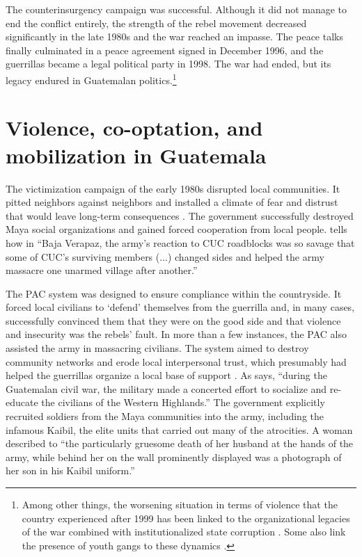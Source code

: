 \documentclass[12pt, notitlepage]{article}
\begin{document}
The counterinsurgency campaign was successful.
Although it did not manage to end the conflict entirely, the strength of the rebel movement decreased significantly in the late 1980s and the war reached an impasse.
The peace talks finally culminated in a peace agreement signed in December 1996, and the guerrillas became a legal political party in 1998.
The war had ended, but its legacy endured in Guatemalan politics.\footnote{Among other things, the worsening situation in terms of violence that the country experienced after 1999 has been linked to the organizational legacies of the war combined with institutionalized state corruption \citep{Peacock:2003tt, Beltran:2016td, Booth:2010wd}. Some also link the presence of youth gangs to these dynamics \citep{Levenson:2013tm}.}

\section*{Violence, co-optation, and mobilization in Guatemala}

The victimization campaign of the early 1980s disrupted local communities. It pitted neighbors against neighbors and installed a climate of fear and distrust that would leave long-term consequences \citep{Burrell:2013aa}.
The government successfully destroyed Maya social organizations and gained forced cooperation from local people.
\citet[101]{Stoll:1999aa} tells how in ``Baja Verapaz, the army's reaction to CUC roadblocks was so savage that some of CUC's surviving members (...) changed sides and helped the army massacre one unarmed village after another.''

The PAC system was designed to ensure compliance within the countryside.
It forced local civilians to `defend' themselves from the guerrilla and, in many cases, successfully convinced them that they were on the good side and that violence and insecurity was the rebels' fault.
In more than a few instances, the PAC also assisted the army in massacring civilians.
The system aimed to destroy community networks and erode local interpersonal trust, which presumably had helped the guerrillas organize a local base of support \citep{SaenzdeTejada:2004aa}.
As \citet[641]{Bateson:2017aa} says, ``during the Guatemalan civil war, the military made a concerted effort to socialize and re-educate the civilians of the Western Highlands.''
The government explicitly recruited soldiers from the Maya communities into the army, including the infamous Kaibil, the elite units that carried out many of the atrocities.
A woman described to \citet[112]{Green:1995aa} ``the particularly gruesome death of her husband at the hands of the army, while behind her on the wall prominently displayed was a photograph of her son in his Kaibil uniform.''
\end{document}
